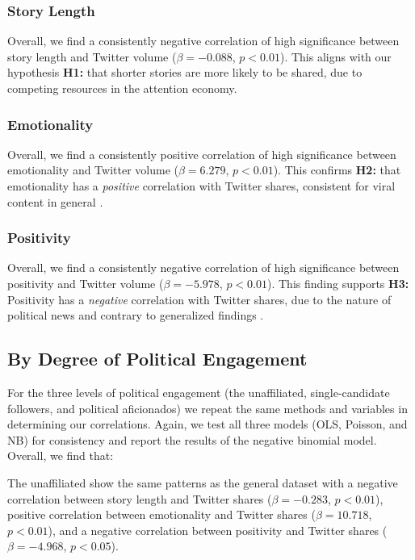 \documentclass[letterpaper]{article}
\begin{document}
\subsubsection{Story Length}
Overall, we find a consistently negative correlation of high significance between story length and Twitter volume ($\beta=-0.088$, $p<0.01$). 
This aligns with our hypothesis \textbf{H1:} that shorter stories are more likely to be shared, due to competing resources in the attention economy.
 
\subsubsection{Emotionality}
Overall, we find a consistently positive correlation of high significance between emotionality and Twitter volume ($\beta=6.279$, $p<0.01$). This confirms \textbf{H2:} that emotionality has a \emph{positive} correlation with Twitter shares, consistent for viral content in general \cite{berger2012makes}.

\subsubsection{Positivity}
Overall, we find a consistently negative correlation of high significance between positivity and Twitter volume ($\beta=−5.978$, $p<0.01$). This finding supports \textbf{H3:} Positivity has a \emph{negative} correlation with Twitter shares, due to the nature of political news and contrary to generalized findings \cite{berger2012makes, hansen2011good}.

\subsection{By Degree of Political Engagement}
For the three levels of political engagement (the unaffiliated, single-candidate followers, and political aficionados) we repeat the same methods and variables in determining our correlations. Again, we test all three models (OLS, Poisson, and NB) for consistency and report the results of the negative binomial model. Overall, we find that: 

The unaffiliated show the same patterns as the general dataset with a negative correlation between story length and Twitter shares ($\beta=-0.283$, $p<0.01$), positive correlation between emotionality and Twitter shares ($\beta=10.718$, $p<0.01$), and a negative correlation between positivity and Twitter shares ($\beta=-4.968$, $p<0.05$).
\end{document}
